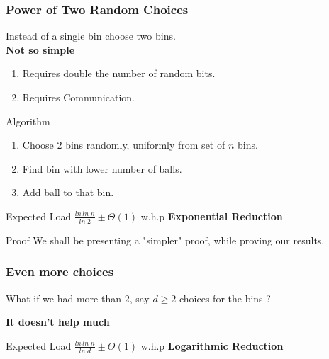 \documentclass{beamer}
\begin{document}
\begin{frame}
 \frametitle{Power of Two Random Choices}
 Instead of a single bin choose two bins. \\
\pause
\textbf{Not so simple} \\
\pause
\begin{enumerate}
 \item Requires double the number of random bits. \\
 \item Requires Communication. \\
\end{enumerate}
\pause
\begin{block}
{Algorithm}
\begin{enumerate}
 \item Choose $2$ bins randomly, uniformly from set of $n$ bins. 
\item Find bin with lower number of balls. 
\item Add ball to that bin.
\end{enumerate}
\pause
\end{block}
\begin{block}
{Expected Load}
$\frac{ln \, ln \; n}{ln \; 2}  \pm \Theta (1)$ w.h.p \pause \textbf{Exponential Reduction}
\end{block}
\pause
\begin{block}
 {Proof}
We shall be presenting a "simpler" proof, while proving our results.
\end{block}
\end{frame}


\begin{frame}
\frametitle{Even more choices}
What if we had more than $2$, say $d \geq 2$ choices for the bins ?
\begin{center}
 \textbf{It doesn't help much}
\end{center}
\pause
\begin{block}
{Expected Load}
$\frac{ln \, ln \; n}{ln \; d}  \pm \Theta (1)$ w.h.p \pause \textbf{Logarithmic Reduction}
\end{block}
\end{frame}

\end{document}
